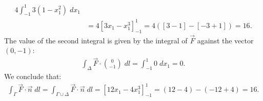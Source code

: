 \documentclass[11pt]{article}
\begin{document}
\begin{solution}
\begin{align*}
        4 \int_{-1}^1 3( 1-x_1^2)\;d x_1
        \\&=
        4 \left[ 3 x_1 - x_1^3 \right]_{-1}^1
        =
        4 \left( \left[ 3 - 1 \right] - \left[ -3 + 1 \right] \right)
        = 
        16
        .
    \end{align*}
    The value of the second integral is given by the integral of $\vec{F}$ against the vector $(0,-1)$:
    \begin{align*}
        \int_{\Delta} \vec{F} \cdot \binom{0}{-1} \; dl
        =
        \int_{-1}^1 0 \; dx_1
        =
        0
        .
    \end{align*}
    We conclude that:
    \begin{align*}
        \int_{\Gamma} \vec{F} \cdot \vec{n} \; dl
        = 
        \int_{\Gamma\cup \Delta} \vec{F} \cdot \vec{n} \; dl
        =
        \left[ 12 x_1 - 4 x_1^3 \right]_{-1}^1
        =
        ( 12 - 4 ) - ( -12 + 4 )
        = 
        16.
    \end{align*}
\end{solution}
\end{document}
